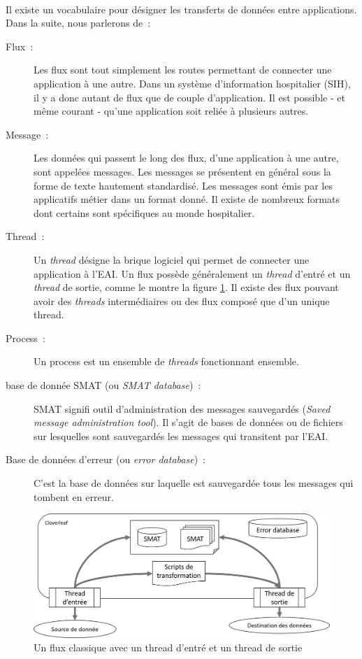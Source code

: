 			\paragraph{}%
 			Il existe un vocabulaire pour désigner les transferts de données entre
 			applications. Dans la suite, nous parlerons de~:
 			\begin{description}
 				\item[Flux~:] Les flux sont tout simplement les routes permettant de
 				connecter une application à une autre. Dans un système d'information hospitalier
 				(SIH), il y a donc autant de flux que de couple d'application. Il est
 				possible - et même courant - qu'une application soit reliée à plusieurs
 				autres.
 				\item[Message~:] Les données qui passent le long des flux, d'une
 				application à une autre, sont appelées messages. Les messages se présentent en général
 				sous la forme de texte hautement standardisé. Les messages sont émis par les
 				applicatifs métier dans un format donné. Il existe de nombreux formats
 				dont certains sont spécifiques au monde hospitalier.
 				\item[Thread~:] Un \textit{thread} désigne la brique logiciel qui permet de
 				connecter une application à l'EAI. Un flux possède généralement un
 				\textit{thread} d'entré et un \textit{thread} de sortie, comme le montre
 				la figure \ref{eai_tech}.
 				Il existe des flux pouvant avoir des \textit{threads} intermédiaires ou des flux composé
 				que d'un unique thread.
 				\item[Process~:] Un process est un ensemble de \textit{threads}
 				fonctionnant ensemble.
 				\item[base de donnée SMAT (ou \textit{SMAT database})~:] SMAT signifi outil
 				d'administration des messages sauvegardés (\textit{Saved message administration tool}). Il
 				s'agit de bases de données ou de fichiers sur lesquelles sont sauvegardés
 				les messages qui transitent par l'EAI.
 				\item[Base de données d'erreur (ou \textit{error database})~:] C'est la
 				base de données sur laquelle est sauvegardée tous les messages qui tombent
 				en erreur.
 			\end{description}
			\begin{figure}[H]
				\centering
				\includegraphics[width=15cm]{../img/eai_technique.png}
				\caption{\label{eai_tech} Un flux classique avec un thread d'entré et un
				thread de sortie}
			\end{figure}
			
